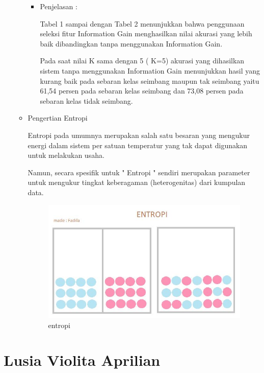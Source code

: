 \begin{enumerate}
\begin{itemize}
\begin{itemize}
\item Penjelasan :
\par Tabel 1 sampai dengan Tabel 2 menunjukkan bahwa penggunaan seleksi fitur Information Gain menghasilkan nilai akurasi yang lebih baik dibandingkan tanpa menggunakan Information Gain. 
\par Pada saat nilai K sama dengan 5 ( K=5) akurasi yang dihasilkan sistem tanpa menggunakan Information Gain menunjukkan hasil yang kurang baik pada sebaran kelas seimbang maupun tak seimbang yaitu 61,54 persen pada sebaran kelas seimbang dan 73,08 persen pada sebaran kelas tidak seimbang. 
\end{itemize}


\par
\item Pengertian Entropi
\par Entropi pada umumnya merupakan salah satu besaran yang mengukur energi dalam sistem per satuan temperatur yang tak dapat digunakan untuk melakukan usaha.
\par Namun, secara spesifik untuk " Entropi " sendiri merupakan parameter untuk mengukur tingkat keberagaman (heterogenitas) dari kumpulan data. 

\par

\begin{figure}[ht]
\centering
\includegraphics[scale=0.5]{figures/entropi.jpg}
\caption{entropi}
\label{contoh}
\end{figure}

\par
\end{itemize}

\end{enumerate}

\section{Lusia Violita Aprilian}
